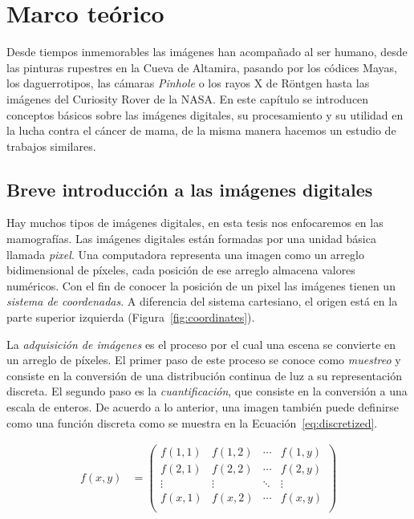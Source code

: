 \chapter{Marco teórico}
\label{marco}

Desde tiempos inmemorables las imágenes han acompañado al ser humano, desde las
pinturas rupestres en la Cueva de Altamira, pasando por los códices Mayas, los
daguerrotipos, las cámaras \textit{Pinhole} o los rayos X de Röntgen hasta las
imágenes del Curiosity Rover de la NASA. En este capítulo se introducen
conceptos básicos sobre las imágenes digitales, su procesamiento y su utilidad
en la lucha contra el cáncer de mama, de la misma manera hacemos un estudio de 
trabajos similares.

\section{Breve introducción a las imágenes digitales}


Hay muchos tipos de imágenes digitales, en esta tesis nos enfocaremos en las
mamografías. Las imágenes digitales están formadas por una unidad básica
llamada \textit{pixel}. Una computadora representa una imagen como un arreglo
bidimensional de píxeles, cada posición de ese arreglo almacena valores
numéricos. Con el fin de conocer la posición de un pixel las imágenes tienen un
\textit{sistema de coordenadas}. A diferencia del sistema cartesiano, el origen
está en la parte superior izquierda (Figura~\ref{fig:coordinates}). 

\shorthandoff{>} %
    
\shorthandon{>} 

La \textit{adquisición de imágenes} es el proceso por el cual una escena se
convierte en un arreglo de píxeles. El primer paso de este proceso se conoce
como \textit{muestreo} y consiste en la conversión de una distribución continua
de luz a su representación discreta. El segundo paso es la
\textit{cuantificación}, que consiste en la conversión a una escala de enteros.
De acuerdo a lo anterior, una imagen también puede definirse como una función
discreta como se muestra en la Ecuación~\ref{eq:discretized}. 

\begin{equation}
\label{eq:discretized}
    \begin{split}
            f(x,y) & = 
            \begin{pmatrix}
                f(1,1) & f(1,2) & \cdots & f(1,y) \\
                f(2,1) & f(2,2) & \cdots & f(2,y) \\
                \vdots & \vdots & \ddots & \vdots \\
                f(x,1) & f(x,2) & \cdots & f(x,y) \\
            \end{pmatrix}
    \end{split}
\end{equation}

